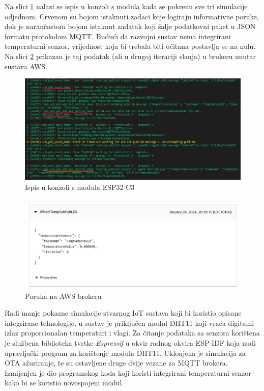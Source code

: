 Na slici \ref{fig:ocean_koda} nalazi se ispis u konzoli s modula kada se pokrenu sve tri simulacije odjednom. Crvenom su bojom istaknuti zadaci koje logiraju informativne poruke, dok je narančastom bojom istaknut zadatak koji šalje podatkovni paket u JSON formatu protokolom MQTT. Budući da razvojni sustav nema integrirani temperaturni senzor, vrijednost koja bi trebala biti očitana postavlja se na nulu. Na slici \ref{fig:kilometarski_primjer} prikazan je taj podatak (ali u drugoj iteraciji slanja) u brokeru unutar sustava AWS.

\begin{figure}[ht]
	\centering
	\includegraphics[scale=0.5]{imgs/ocean_koda}
	\caption{Ispis u konzoli s modula ESP32-C3}
	\label{fig:ocean_koda}
\end{figure}

\begin{figure}[ht]
	\centering
	\includegraphics[scale=0.5]{imgs/kilometarski_primjer}
	\caption{Poruka na AWS brokeru}
	\label{fig:kilometarski_primjer}
\end{figure}

Radi manje pokazne simulacije stvarnog IoT sustava koji bi koristio opisane integrirane tehnologije, u sustav je priključen modul DHT11 koji vraća digitalni izlaz proporcionalan temperaturi i vlagi. Za čitanje podataka sa senzora korištena je službena biblioteka tvrtke \textit{Espressif} u okvir radnog okvira ESP-IDF koja nudi upravljački program za korištenje modula DHT11. Uklonjena je simulacija za OTA ažuriranje, te su ostavljene druge dvije vezane za MQTT brokera. Izmijenjen je dio programskog koda koji koristi integrirani temperaturni senzor kako bi se koristio novospojeni modul. 

